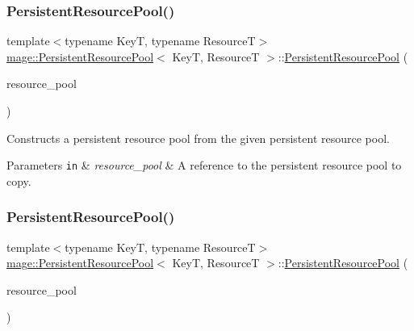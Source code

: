 \subsubsection{\texorpdfstring{Persistent\+Resource\+Pool()}{PersistentResourcePool()}\hspace{0.1cm}{\footnotesize\ttfamily [2/3]}}
{\footnotesize\ttfamily template$<$typename KeyT, typename ResourceT$>$ \\
\hyperlink{classmage_1_1_persistent_resource_pool}{mage\+::\+Persistent\+Resource\+Pool}$<$ KeyT, ResourceT $>$\+::\hyperlink{classmage_1_1_persistent_resource_pool}{Persistent\+Resource\+Pool} (\begin{DoxyParamCaption}\item[{const \hyperlink{classmage_1_1_persistent_resource_pool}{Persistent\+Resource\+Pool}$<$ KeyT, ResourceT $>$ \&}]{resource\+\_\+pool }\end{DoxyParamCaption})\hspace{0.3cm}{\ttfamily [delete]}}

Constructs a persistent resource pool from the given persistent resource pool.


\begin{DoxyParams}[1]{Parameters}
\mbox{\tt in}  & {\em resource\+\_\+pool} & A reference to the persistent resource pool to copy. \\
\hline
\end{DoxyParams}
\hypertarget{classmage_1_1_persistent_resource_pool_a65d48a56df4fc2ea4f38ffbc7a23a59d}{}\label{classmage_1_1_persistent_resource_pool_a65d48a56df4fc2ea4f38ffbc7a23a59d} 
\subsubsection{\texorpdfstring{Persistent\+Resource\+Pool()}{PersistentResourcePool()}\hspace{0.1cm}{\footnotesize\ttfamily [3/3]}}
{\footnotesize\ttfamily template$<$typename KeyT, typename ResourceT$>$ \\
\hyperlink{classmage_1_1_persistent_resource_pool}{mage\+::\+Persistent\+Resource\+Pool}$<$ KeyT, ResourceT $>$\+::\hyperlink{classmage_1_1_persistent_resource_pool}{Persistent\+Resource\+Pool} (\begin{DoxyParamCaption}\item[{\hyperlink{classmage_1_1_persistent_resource_pool}{Persistent\+Resource\+Pool}$<$ KeyT, ResourceT $>$ \&\&}]{resource\+\_\+pool }\end{DoxyParamCaption})}

